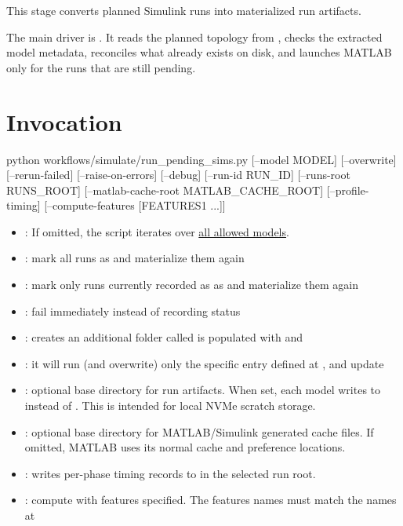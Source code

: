 \documentclass[11pt]{article}
\begin{document}
\label{docstart:simulation_stage}
This stage converts planned Simulink runs into materialized run artifacts.


The main driver is . It reads the planned topology from , checks the extracted model metadata, reconciles what already exists on disk, and launches MATLAB only for the runs that are still pending.

\section*{Invocation}


\begin{DocCode}
python workflows/simulate/run_pending_sims.py [--model MODEL] [--overwrite] [--rerun-failed] [--raise-on-errors] [--debug] [--run-id RUN_ID] [--runs-root RUNS_ROOT] [--matlab-cache-root MATLAB_CACHE_ROOT] [--profile-timing] [--compute-features [FEATURES1 ...]]
\end{DocCode}

\begin{itemize}
\item {}: If omitted, the script iterates over \hyperref[sec:allowed-tsenv-models]{all allowed \name{} models}.
\item {}: mark all runs as  and materialize them again
\item {}: mark only runs currently recorded as  as  and materialize them again
\item {}: fail immediately instead of recording  status
\item {}: creates an additional folder called  is populated with  and 
\item {}: it will run (and overwrite) only the specific entry defined at , and  update 
\item {}: optional base directory for run artifacts. When set, each model writes to  instead of . This is intended for local NVMe scratch storage.
\item {}: optional base directory for MATLAB/Simulink generated cache files. If omitted, MATLAB uses its normal cache and preference locations.
\item {}: writes per-phase timing records to  in the selected run root.
\item {}: compute  with features specified. The features names must match the names at 
\end{itemize}
\end{document}
